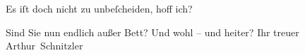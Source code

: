 \pstart
           Es iſt doch nicht zu unbeſcheiden, hoff ich?\pend
           
\pstart
           Sind Sie nun endlich außer Bett? Und wohl – und heiter? Ihr treuer \spacefill\mbox{Arthur
                  Schnitzler}\pend
           \endnumbering{}  
      